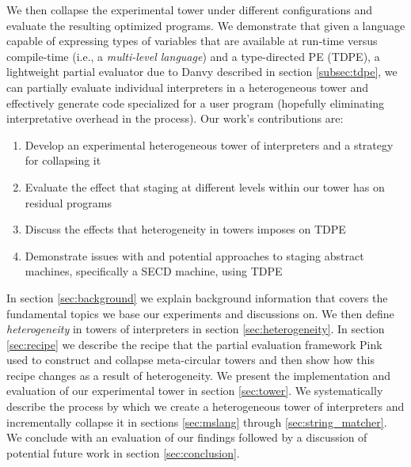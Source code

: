 \documentclass[a4paper,12pt,twoside,openright]{report}
\theoremstyle{definition}
\begin{document}
We then collapse the experimental tower under different configurations and evaluate the resulting optimized programs. We demonstrate that given a language capable of expressing types of variables that are available at run-time versus compile-time (i.e., a \textit{multi-level language}) and a type-directed PE (TDPE), a lightweight partial evaluator due to Danvy \cite{danvy1999type} described in section \ref{subsec:tdpe}, we can partially evaluate individual interpreters in a heterogeneous tower and effectively generate code specialized for a user program (hopefully eliminating interpretative overhead in the process). Our work's contributions are:
\begin{enumerate}
	\item Develop an experimental heterogeneous tower of interpreters and a strategy for collapsing it
	\item Evaluate the effect that staging at different levels within our tower has on residual programs
	\item Discuss the effects that heterogeneity in towers imposes on TDPE
	\item Demonstrate issues with and potential approaches to staging abstract machines, specifically a SECD machine, using TDPE
\end{enumerate}

In section \ref{sec:background} we explain background information that covers the fundamental topics we base our experiments and discussions on. We then define \textit{heterogeneity} in towers of interpreters in section \ref{sec:heterogeneity}. In section \ref{sec:recipe} we describe the recipe that the partial evaluation framework Pink \cite{amin2017collapsing} used to construct and collapse meta-circular towers and then show how this recipe changes as a result of heterogeneity. We present the implementation and evaluation of our experimental tower in section \ref{sec:tower}. We systematically describe the process by which we create a heterogeneous tower of interpreters and incrementally collapse it in sections \ref{sec:mslang} through \ref{sec:string_matcher}. We conclude with an evaluation of our findings followed by a discussion of potential future work in section \ref{sec:conclusion}.
\end{document}
